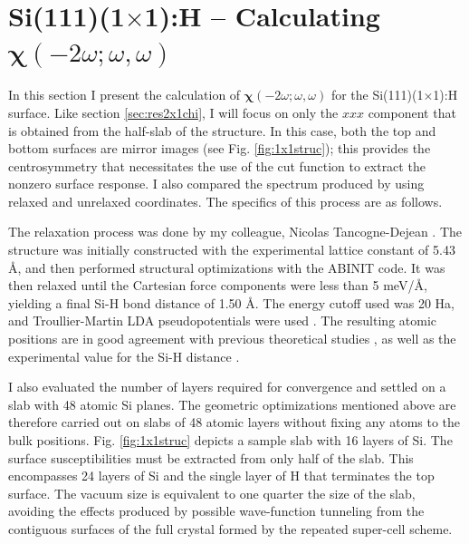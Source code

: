 
\section{\texorpdfstring{Si(111)(1$\times$1):H}{Si(111)(1x1):H} -- Calculating 
\texorpdfstring{$\boldsymbol{\chi}(-2\omega;\omega,\omega)$}{X(-2w;w,w)}}
\label{sec:res1x1chi}

In this section I present the calculation of
$\boldsymbol{\chi}(-2\omega;\omega,\omega)$ for the Si(111)(1$\times$1):H
surface. Like section \ref{sec:res2x1chi}, I will focus on only the $xxx$
component that is obtained from the half-slab of the structure. In this case,
both the top and bottom surfaces are mirror images (see Fig.
\ref{fig:1x1struc}); this provides the centrosymmetry that necessitates the use
of the cut function to extract the nonzero surface response. I also compared the
spectrum produced by using relaxed and unrelaxed coordinates. The specifics of
this process are as follows.

The relaxation process was done by my colleague, Nicolas Tancogne-Dejean
\cite{tancognedejean:tel-01235611}. The structure was initially constructed with
the experimental lattice constant of 5.43 \AA, and then performed structural
optimizations with the ABINIT \cite{gonzeCPS09, abinit} code. It was then
relaxed until the Cartesian force components were less than 5 meV/\AA, yielding
a final Si-H bond distance of 1.50 \AA. The energy cutoff used was 20 Ha, and
Troullier-Martin LDA pseudopotentials were used \cite{troullierPRB91}. The
resulting atomic positions are in good agreement with previous theoretical
studies \cite{kaxirasPRB88, jonaPRB95, alfonsoPRB96, cargnoniJOCP00,
mejiaPRB02}, as well as the experimental value for the Si-H distance
\cite{weastCRC88}.

I also evaluated the number of layers required for convergence and settled on a
slab with 48 atomic Si planes. The geometric optimizations mentioned above are
therefore carried out on slabs of 48 atomic layers without fixing any atoms to
the bulk positions. Fig. \ref{fig:1x1struc} depicts a sample slab with 16 layers
of Si. The surface susceptibilities must be extracted from only half of the
slab. This encompasses 24 layers of Si and the single layer of H that terminates
the top surface. The vacuum size is equivalent to one quarter the size of the
slab, avoiding the effects produced by possible wave-function tunneling from the
contiguous surfaces of the full crystal formed by the repeated super-cell
scheme.\cite{mendozaPRB06}

